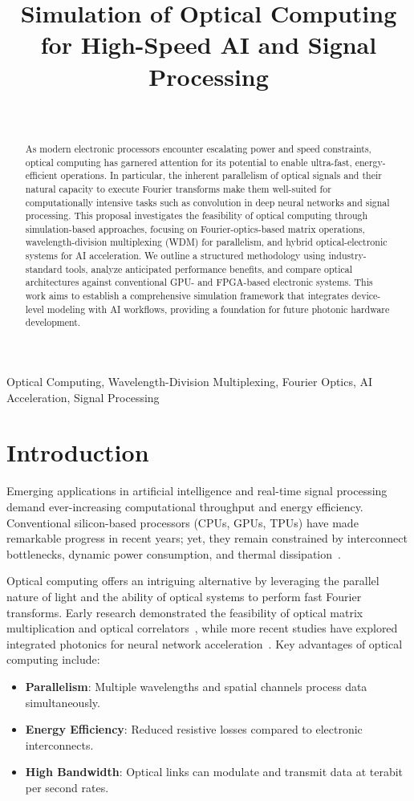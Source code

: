 \documentclass[conference]{IEEEtran}
\title{\textbf{Simulation of Optical Computing for High-Speed AI and Signal Processing}}
\author{\IEEEauthorblockN{Santiago Sosa\& Marc DeCarlo}\\
\IEEEauthorblockA{Department of Electrical and Computer Engineering, Drexel University\\
Email: \{ss5427, mad534\}@drexel.edu}}
\begin{document}
\maketitle

\begin{abstract}
As modern electronic processors encounter escalating power and speed constraints, optical computing has garnered attention for its potential to enable ultra-fast, energy-efficient operations. In particular, the inherent parallelism of optical signals and their natural capacity to execute Fourier transforms make them well-suited for computationally intensive tasks such as convolution in deep neural networks and signal processing. This proposal investigates the feasibility of optical computing through simulation-based approaches, focusing on Fourier-optics-based matrix operations, wavelength-division multiplexing (WDM) for parallelism, and hybrid optical-electronic systems for AI acceleration. We outline a structured methodology using industry-standard tools, analyze anticipated performance benefits, and compare optical architectures against conventional GPU- and FPGA-based electronic systems. This work aims to establish a comprehensive simulation framework that integrates device-level modeling with AI workflows, providing a foundation for future photonic hardware development.
\end{abstract}

\begin{IEEEkeywords}
Optical Computing, Wavelength-Division Multiplexing, Fourier Optics, AI Acceleration, Signal Processing
\end{IEEEkeywords}

\section{Introduction}
Emerging applications in artificial intelligence and real-time signal processing demand ever-increasing computational throughput and energy efficiency. Conventional silicon-based processors (CPUs, GPUs, TPUs) have made remarkable progress in recent years; yet, they remain constrained by interconnect bottlenecks, dynamic power consumption, and thermal dissipation~\cite{jouppi2017datacenter}.

Optical computing offers an intriguing alternative by leveraging the parallel nature of light and the ability of optical systems to perform fast Fourier transforms. Early research demonstrated the feasibility of optical matrix multiplication and optical correlators~\cite{goodman2005introduction}, while more recent studies have explored integrated photonics for neural network acceleration~\cite{shen2017deep}. Key advantages of optical computing include:
\begin{itemize}
    \item \textbf{Parallelism}: Multiple wavelengths and spatial channels process data simultaneously.
    \item \textbf{Energy Efficiency}: Reduced resistive losses compared to electronic interconnects.
    \item \textbf{High Bandwidth}: Optical links can modulate and transmit data at terabit per second rates.
\end{itemize}
\end{document}
